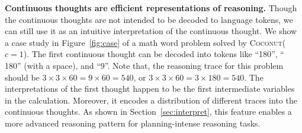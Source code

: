 \documentclass[]{fairmeta}
\newcommand{\ours}{\textsc{Coconut}\xspace}
\begin{document}
\noindent \textbf{Continuous thoughts are efficient representations of reasoning.} 
Though the continuous thoughts are not intended to be decoded to language tokens, we can still use it as an intuitive interpretation of the continuous thought. We show a case study in Figure~\ref{fig:case} of a math word problem solved by \ours ($c=1$). The first continuous thought can be decoded into tokens like ``180'', `` 180'' (with a space), and ``9''. Note that, the reasoning trace for this problem should be $3\times 3 \times 60 = 9 \times 60 = 540$, or  $3\times 3 \times 60 = 3 \times 180 = 540$. The interpretations of the first thought happen to be the first intermediate variables in the calculation. Moreover, it encodes a distribution of different traces into the continuous thoughts. As shown in Section~\ref{sec:interpret}, this feature enables a more advanced reasoning pattern for planning-intense reasoning tasks.

\end{document}
